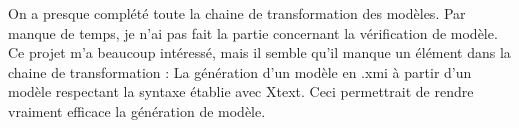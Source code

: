On a presque complété toute la chaine de transformation des modèles.
Par manque de temps, je n'ai pas fait la partie concernant la vérification de modèle.\\

Ce projet m'a beaucoup intéressé, mais il semble qu'il manque un élément dans la chaine de transformation : La génération d'un modèle en .xmi à partir d'un modèle respectant la syntaxe établie avec Xtext.
Ceci permettrait de rendre vraiment efficace la génération de modèle.
